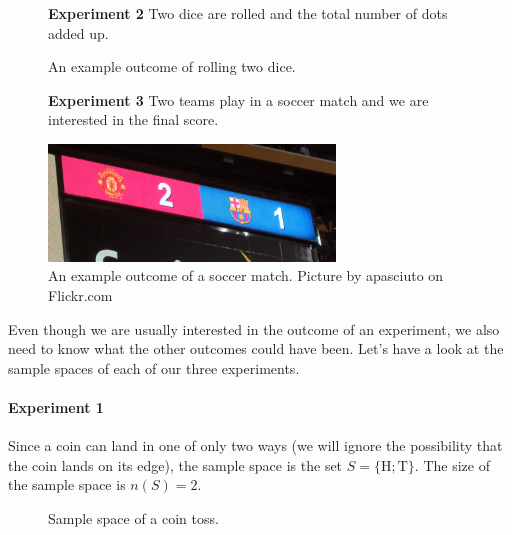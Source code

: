 \begin{figure}[H]
  \textbf{Experiment 2} Two dice are rolled and the total number of
  dots added up.

  \begin{center}
  \end{center}
  \caption{An example outcome of rolling two dice.}
\end{figure}

\begin{figure}[H]
  \textbf{Experiment 3} Two teams play in a soccer match and we are
  interested in the final score.

  \begin{center}
    \includegraphics[width=3in]{Gr10-Probability-images/5996076302_412ec8d8d0_o.jpg}
  \end{center}
  \caption{An example outcome of a soccer match. Picture by apasciuto on Flickr.com}
\end{figure}


Even though we are usually interested in the outcome of an experiment,
we also need to know what the other outcomes could have been. Let's
have a look at the sample spaces of each of our three experiments.

\paragraph{Experiment 1} Since a coin can land in one of only two ways
(we will ignore the possibility that the coin lands on its edge), the
sample space is the set \(S=\{\textrm{H}; \textrm{T}\}\). The size of the sample space
is \(n(S)=2\).

\begin{figure}[H]
  \begin{center}
  \end{center}
  \caption{Sample space of a coin toss.}
\end{figure} 

